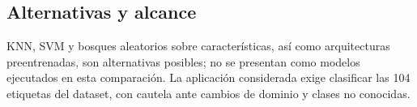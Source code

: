 \subsection{Alternativas y alcance}
KNN, SVM y bosques aleatorios sobre características, así como arquitecturas
preentrenadas, son alternativas posibles; no se presentan como modelos ejecutados
en esta comparación. La aplicación considerada exige clasificar las 104 etiquetas
del dataset, con cautela ante cambios de dominio y clases no conocidas.
